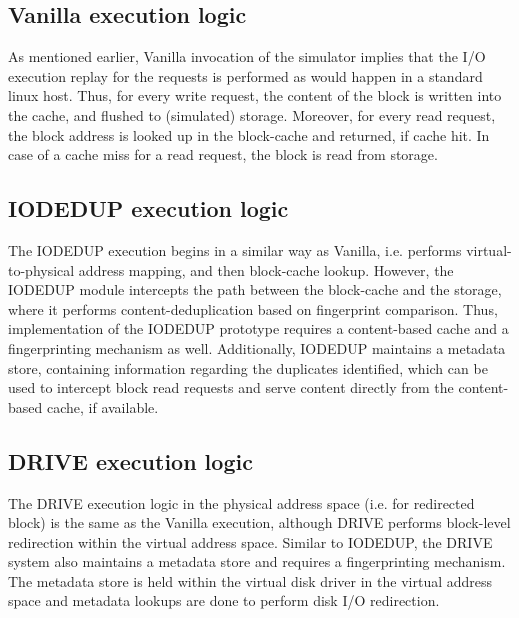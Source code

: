 \subsection{Vanilla execution logic}
As mentioned earlier, Vanilla invocation of the simulator implies that
the I/O execution replay for the requests is performed as would happen
in a standard linux host. Thus, for every write request, the content of
the block is written into the cache, and flushed to (simulated) storage. 
Moreover, for every read request, the block address is looked up in the
block-cache and returned, if cache hit. In case of a cache miss for a
read request, the block is read from storage.

\subsection{IODEDUP execution logic}
The IODEDUP execution begins in a similar way as Vanilla, i.e. 
performs virtual-to-physical address mapping, and then block-cache lookup.
However, the IODEDUP module intercepts the path between the block-cache
and the storage, where it performs content-deduplication based on 
fingerprint comparison. Thus, implementation of the IODEDUP prototype requires 
a content-based cache and a fingerprinting mechanism as well.
Additionally, IODEDUP maintains a metadata store, containing 
information regarding the duplicates identified, which can be used 
to intercept block read requests and serve content directly from the
content-based cache, if available.

\subsection{DRIVE execution logic}
The DRIVE execution logic in the physical address space (i.e. for redirected
block) is the same as the Vanilla execution, although DRIVE performs block-level
redirection within the virtual address space. Similar to IODEDUP, the
DRIVE system also maintains a metadata store and requires a fingerprinting
mechanism. The metadata store is held within the virtual disk driver in
the virtual address space and metadata lookups are done to perform
disk I/O redirection. %


